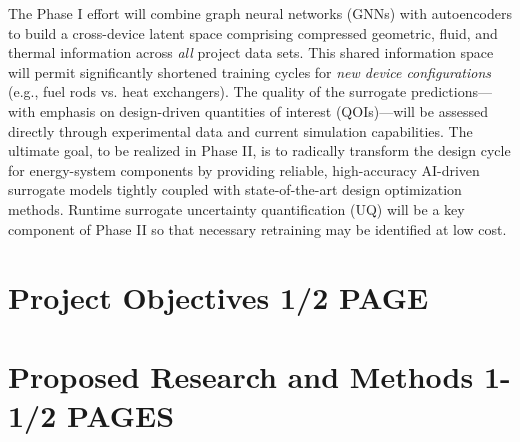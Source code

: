   The Phase I effort will combine graph neural networks (GNNs) with
autoencoders to build a cross-device latent space comprising compressed
geometric, fluid, and thermal information across {\em all} project data sets.  
This shared information space will permit significantly shortened
training cycles for {\em new device configurations} (e.g., fuel rods vs. heat
exchangers).  The quality of the surrogate predictions---with 
emphasis on design-driven quantities of interest (QOIs)---will be
assessed directly through experimental data and current simulation
capabilities.  The ultimate goal, to be realized in Phase II,
is to radically transform the design cycle for energy-system components by
providing reliable, high-accuracy AI-driven surrogate models tightly coupled
with state-of-the-art design optimization methods.  Runtime surrogate
uncertainty quantification (UQ) will be a key component of Phase II so that
necessary retraining may be identified at low cost.



\section{Project Objectives \hspace{1.0in} 1/2 PAGE}




\noindent

\vspace*{.1in}
\section{Proposed Research and Methods \hspace{1.0in} 1-1/2 PAGES}


